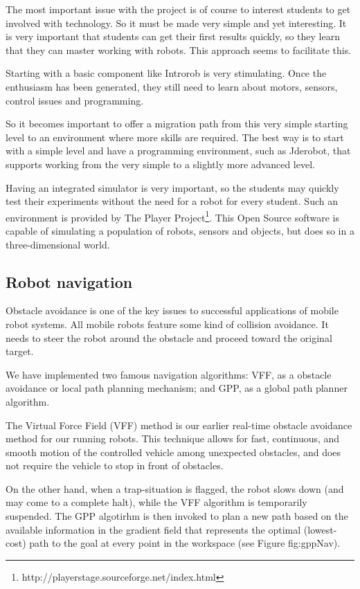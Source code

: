 \documentclass[twocolumn]{svjour3}          %
\begin{document}
The most important issue with the project is of course to interest students to get involved with technology. So it must be made very simple and yet interesting. It is very important that students can get their first results quickly, so they learn that they can master working with robots. This approach seems to facilitate this.


Starting with a basic component like Introrob is very stimulating. Once the enthusiasm has been generated, they still need to learn about motors, sensors, control issues and programming.

So it becomes important to offer a migration path from this very simple starting level to an environment where more skills are required. The best way is to start with a simple level and have a programming environment, such as Jderobot, that supports working from the very simple to a slightly more advanced level.


Having an integrated simulator is very important, so the students may quickly test their experiments without the need for a robot for every student. Such an environment is provided by The Player Project\footnote{http://playerstage.sourceforge.net/index.html}. This Open Source software is capable of simulating a population of robots, sensors and objects, but does so in a three-dimensional world.


\subsection{Robot navigation}

Obstacle avoidance is one of the key issues to successful applications of mobile robot systems. All mobile robots feature some kind of collision avoidance. It needs to steer the robot around the obstacle and proceed toward the original target.

We have implemented two famous navigation algorithms: VFF, as a obstacle avoidance or local path planning mechanism; and GPP, as a global path planner algorithm.

The Virtual Force Field (VFF) method is our earlier real-time obstacle avoidance method for our running robots. This technique allows for fast, continuous, and smooth motion of the controlled vehicle among unexpected obstacles, and does not require the vehicle to stop in front of obstacles.

On the other hand, when a trap-situation is flagged, the robot slows down (and may come to a complete halt),
while the VFF algorithm is temporarily suspended. The GPP algotirhm is then invoked to plan a new path based on the available information in the gradient field that represents the optimal (lowest-cost) path to the goal at every point in the workspace (see Figure {fig:gppNav}).
\end{document}
